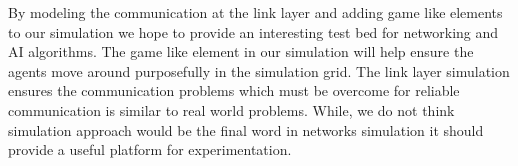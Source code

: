\documentclass[12pt]{article}
\begin{document}
By modeling the communication at the link layer and adding game like elements to our simulation we hope to provide an interesting test bed for networking and AI algorithms. The game like element in our simulation will help ensure the agents move around purposefully in the simulation grid. The link layer simulation ensures the communication problems which must be overcome for reliable communication is similar to real world problems. While, we do not think simulation approach would be the final word in networks simulation it should provide a useful platform for experimentation.











\nocite{*}


\end{document}
